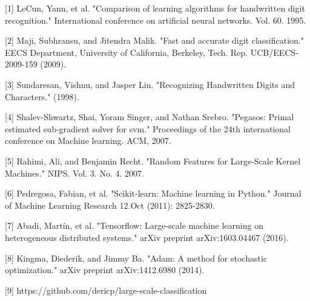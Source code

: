 \documentclass{article} %
\begin{document}
\small{
  [1] LeCun, Yann, et al. "Comparison of learning algorithms for handwritten
  digit recognition." International conference on artificial neural networks.
  Vol. 60. 1995.	

  [2] Maji, Subhransu, and Jitendra Malik. "Fast and accurate digit
  classification." EECS Department, University of California,
  Berkeley, Tech. Rep. UCB/EECS-2009-159 (2009).

  [3] Sundaresan, Vishnu, and Jasper Lin. "Recognizing Handwritten Digits and
  Characters." (1998).

  [4] Shalev-Shwartz, Shai, Yoram Singer, and Nathan Srebro. "Pegasos: Primal
  estimated sub-gradient solver for svm." Proceedings of the 24th international
  conference on Machine learning. ACM, 2007.

  [5] Rahimi, Ali, and Benjamin Recht. "Random Features for Large-Scale Kernel
  Machines." NIPS. Vol. 3. No. 4. 2007.

  [6] Pedregosa, Fabian, et al. "Scikit-learn: Machine learning in Python."
  Journal of Machine Learning Research 12.Oct (2011): 2825-2830.

  [7] Abadi, Martín, et al. "Tensorflow: Large-scale machine learning on
  heterogeneous distributed systems." arXiv preprint arXiv:1603.04467 (2016).

  [8] Kingma, Diederik, and Jimmy Ba. "Adam: A method for stochastic
  optimization." arXiv preprint arXiv:1412.6980 (2014).

  [9] https://github.com/dericp/large-scale-classification
}
\end{document}
